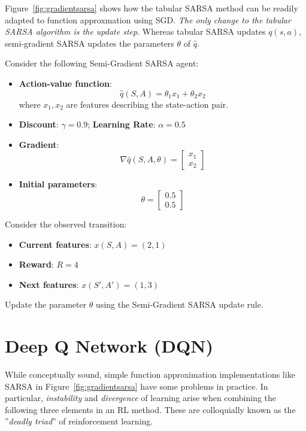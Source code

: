 Figure~\ref{fig:gradientsarsa} shows how the tabular SARSA method can be readily adapted to function approxmation using SGD. \emph{The only change to the tabular SARSA algorithm is the update step}. Whereas tabular SARSA updates $q(s, a)$, semi-gradient SARSA updates the parameters $\theta$ of $\hat{q}$. 


\begin{exerciseboxpaper}
Consider the following Semi-Gradient SARSA agent:

\begin{itemize}
    \item {\bf Action-value function}: $$\hat{q}(S, A) = \theta_1 x_1 + \theta_2 x_2$$ where $x_1, x_2$ are features describing the state-action pair.
    \item {\bf Discount}: $\gamma=0.9$; {\bf Learning Rate}: $\alpha=0.5$
    \item {\bf Gradient}: $$\nabla \hat{q}(S, A, \theta) = \begin{bmatrix} x_1 \\ x_2 \end{bmatrix}$$
    \item {\bf Initial parameters}: $$\theta = \begin{bmatrix} 0.5 \\ 0.5 \end{bmatrix}$$
\end{itemize}

Consider the observed transition: 
\begin{itemize}
   \item {\bf Current features}: $x(S, A) = (2, 1)$
   \item {\bf Reward}: $R=4$
   \item {\bf Next features}: $x(S', A') = (1, 3)$
\end{itemize}
\vspace{.5\baselineskip}

Update the parameter $\theta$ using the Semi-Gradient SARSA update rule.
\end{exerciseboxpaper}


\section{Deep Q Network (DQN)}

While conceptually sound, simple function approximation implementations like SARSA in Figure~\ref{fig:gradientsarsa} have some problems in practice. In particular, \emph{instability} and \emph{divergence} of learning arise when combining the following three elements in an RL method. These are colloquially known as the ''\emph{deadly triad}'' of reinforcement learning.

